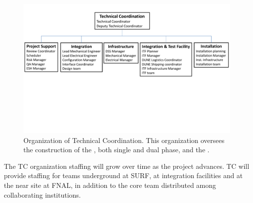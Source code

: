 \begin{figure}[htb]
  \begin{center}
    \includegraphics[width=\textwidth]{far-detector-generic/figures/TP_TC_Org_Chart}
    \caption{Organization of Technical Coordination. This organization
      oversees the construction of the , both single and
      dual phase, and the .}
    \label{fig:TC_orgchart}
  \end{center}
\end{figure}
The TC organization staffing will grow over time as the project
advances. TC will provide staffing for teams underground at SURF, at
integration facilities and at the near site at FNAL, in addition to
the core team distributed among collaborating institutions.


